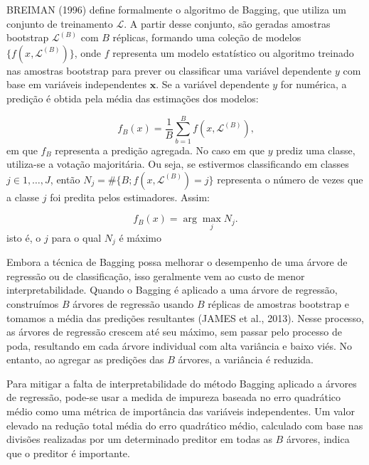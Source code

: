 \documentclass[
  12pt,
  a4paper,
]{scrreprt}
\begin{document}
\vspace{12pt}

BREIMAN (1996) define formalmente o algoritmo de Bagging, que utiliza um
conjunto de treinamento \(\mathcal{L}\). A partir desse conjunto, são
geradas amostras bootstrap \(\mathcal{L}^{(B)}\) com \(B\) réplicas,
formando uma coleção de modelos \(\{f(x, \mathcal{L}^{(B)})\}\), onde
\(f\) representa um modelo estatístico ou algoritmo treinado nas
amostras bootstrap para prever ou classificar uma variável dependente
\(y\) com base em variáveis independentes \(\mathbf{x}\). Se a variável
dependente \(y\) for numérica, a predição é obtida pela média das
estimações dos modelos:

\[
f_{B}\left(x\right) = \frac{1}{B} \sum_{b = 1}^B f \left(x, \mathcal{L}^{\left(B\right)}\right)\text{,}
\] em que \(f_{B}\) representa a predição agregada. No caso em que \(y\)
prediz uma classe, utiliza-se a votação majoritária. Ou seja, se
estivermos classificando em classes \(j \in {1, \dots, J}\), então
\(N_j = \#\{B; f(x, \mathcal{L}^{(B)}) = j\}\) representa o número de
vezes que a classe \(j\) foi predita pelos estimadores. Assim:

\[
f_{B}\left(x\right) = \arg \max_{j} N_j\text{.}
\] isto é, o \(j\) para o qual \(N_j\) é máximo

\vspace{12pt}

Embora a técnica de Bagging possa melhorar o desempenho de uma árvore de
regressão ou de classificação, isso geralmente vem ao custo de menor
interpretabilidade. Quando o Bagging é aplicado a uma árvore de
regressão, construímos \(B\) árvores de regressão usando \(B\) réplicas
de amostras bootstrap e tomamos a média das predições resultantes (JAMES
et al., 2013). Nesse processo, as árvores de regressão crescem até seu
máximo, sem passar pelo processo de poda, resultando em cada árvore
individual com alta variância e baixo viés. No entanto, ao agregar as
predições das \(B\) árvores, a variância é reduzida.

\vspace{12pt}

Para mitigar a falta de interpretabilidade do método Bagging aplicado a
árvores de regressão, pode-se usar a medida de impureza baseada no erro
quadrático médio como uma métrica de importância das variáveis
independentes. Um valor elevado na redução total média do erro
quadrático médio, calculado com base nas divisões realizadas por um
determinado preditor em todas as \(B\) árvores, indica que o preditor é
importante.
\end{document}
